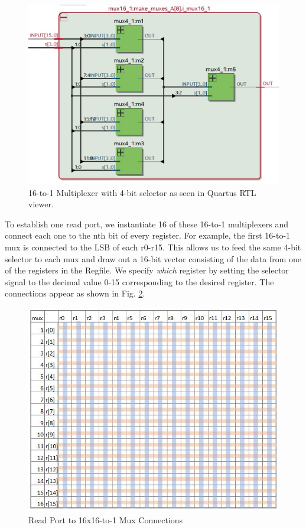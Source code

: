 \documentclass[conference]{IEEEtran}
\begin{document}
\begin{figure}[htbp]
    \centering
    \includegraphics[scale=0.3]{lab_2_figures/16-to-1-mux.JPG}
    \caption{16-to-1 Multiplexer with 4-bit selector as seen in Quartus RTL viewer.}
    \label{fig:16_to_1_mux}
\end{figure}
To establish one read port, we instantiate 16 of these 16-to-1 multiplexers and connect each one to the nth bit of every register. For example, the first 16-to-1 mux is connected to the LSB of each r0-r15. This allows us to feed the same 4-bit selector to each mux and draw out a 16-bit vector consisting of the data from one of the registers in the Regfile. We specify \textit{which} register by setting the selector signal to the decimal value 0-15 corresponding to the desired register. The connections appear as shown in Fig. \ref{fig:read_port_mux_connections}.

\begin{figure}[h]
    \centering
    \includegraphics[scale=0.50]{lab_2_figures/read_port_mux_connections.JPG}
    \caption{Read Port to 16x16-to-1 Mux Connections}
    \label{fig:read_port_mux_connections}
\end{figure}
\end{document}
